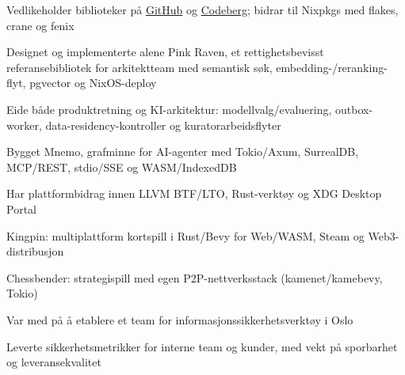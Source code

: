 {  \cvRoleBreak
  \begin{cvitems}
    \item Vedlikeholder biblioteker p{\aa} \href{https://github.com/caniko}{GitHub} og \href{https://codeberg.org/caniko}{Codeberg}; bidrar til Nixpkgs med flakes, crane og fenix
    \item Designet og implementerte alene Pink Raven, et rettighetsbevisst referansebibliotek for arkitektteam med semantisk s{\o}k, embedding-/reranking-flyt, pgvector og NixOS-deploy
    \item Eide b{\aa}de produktretning og KI-arkitektur: modellvalg/evaluering, outbox-worker, data-residency-kontroller og kuratorarbeidsflyter
    \item Bygget Mnemo, grafminne for AI-agenter med Tokio/Axum, SurrealDB, MCP/REST, stdio/SSE og WASM/IndexedDB
    \item Har plattformbidrag innen LLVM BTF/LTO, Rust-verkt{\o}y og XDG Desktop Portal
  \end{cvitems}

  \cvRoleBreak
  \begin{cvitems}
    \item Kingpin: multiplattform kortspill i Rust/Bevy for Web/WASM, Steam og Web3-distribusjon
    \item Chessbender: strategispill med egen P2P-nettverksstack (kamenet/kamebevy, Tokio)
  \end{cvitems}

  \cvRoleBreak
  \begin{cvitems}
    \item Var med p{\aa} {\aa} etablere et team for informasjonssikkerhetsverkt{\o}y i Oslo
    \item Leverte sikkerhetsmetrikker for interne team og kunder, med vekt p{\aa} sporbarhet og leveransekvalitet
  \end{cvitems}
}

